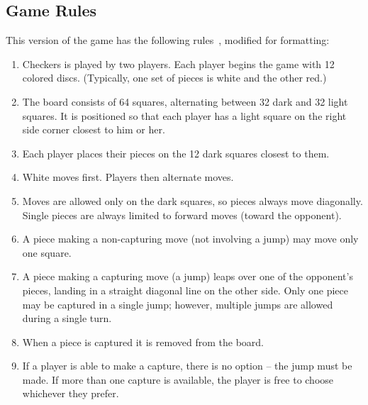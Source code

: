 \documentclass[letterpaper]{article}
\begin{document}
\subsection{Game Rules}
\label{sec:description_rules}

This version of the game has the following rules~\cite{rules},
modified for formatting:

\begin{enumerate}
    \item Checkers is played by two players. Each player begins
          the game with 12 colored discs. (Typically, one set of
          pieces is white and the other red.)
          
    \item The board consists of 64 squares, alternating between
          32 dark and 32 light squares. It is positioned so that
          each player has a light square on the right side
          corner closest to him or her.

    \item Each player places their pieces on the 12 dark squares
          closest to them.
          
    \item White moves first. Players then alternate moves.
    
    \item Moves are allowed only on the dark squares, so pieces
          always move diagonally. Single pieces are always
          limited to forward moves (toward the opponent).
          
    \item A piece making a non-capturing move (not involving a
          jump) may move only one square.
          
    \item A piece making a capturing move (a jump) leaps over
          one of the opponent's pieces, landing in a straight
          diagonal line on the other side. Only one piece may be
          captured in a single jump; however, multiple jumps are
          allowed during a single turn.
          
    \item When a piece is captured it is removed from the board.
    
    \item If a player is able to make a capture, there is no
          option -- the jump must be made. If more than one
          capture is available, the player is free to choose
          whichever they prefer.
          

\end{enumerate}
\end{document}
